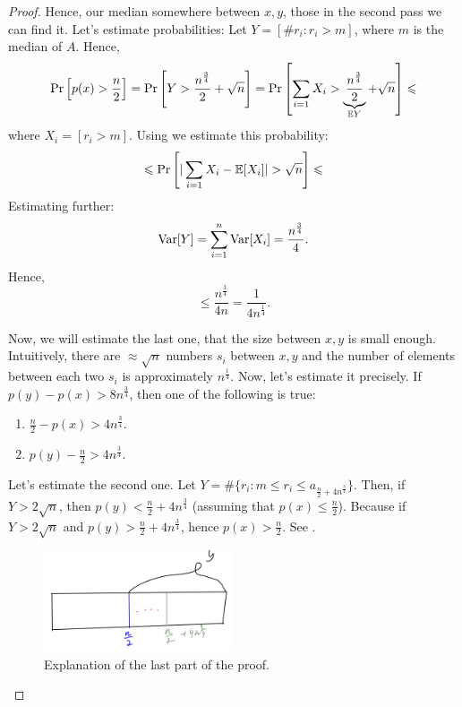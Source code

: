 \begin{proof}
    Hence, our median somewhere between $x, y$, those in the second pass we can find it.
    Let's estimate probabilities:
    Let $Y = [\# r_i \colon r_i > m]$, where $m$ is the median of $A$.
    Hence,
    \begin{align*}
        \Pr\left[p(x) > \frac n 2\right] = \Pr\left[Y > \frac{n^{\frac 3 4}}2 + \sqrt n\right] = \Pr\left[\sum_{i = 1} X_i > \underbrace{\frac{n^{\frac 3 4}}2}_{\mathbb{E} Y} + \sqrt n\right] \leqslant
    \end{align*} where $X_i = [r_i > m]$.
    Using  we estimate this probability:
    \[
        \leqslant \Pr\left[ |\sum_{i = 1} X_i - \mathbb{E}[X_i]| > \sqrt n\right] \leqslant
    \]
    Estimating further:
    \[
        \operatorname{Var}[Y] = \sum_{i = 1}^n \operatorname{Var}[X_i] = \frac {n^{\frac 3 4}} 4.
    \]
    Hence,
    \[
        \leq \frac {n^{\frac 3 4}} {4 n} = \frac {1} {4 n^{\frac 1 4}}.
    \]

    Now, we will estimate the last one, that the size between $x, y$ is small enough.
    Intuitively, there are $\approx \sqrt n$ numbers $s_i$ between $x, y$ and the number of elements between each two $s_i$ is approximately $n^{\frac 1 4}$.
    Now, let's estimate it precisely.
    If $p(y) - p(x) > 8 n^{\frac 3 4}$, then one of the following is true:
    \begin{enumerate}
        \item $\frac n 2 - p(x) > 4 n^{\frac 3 4}$.
        \item $p(y) - \frac n 2 > 4 n^{\frac 3 4}$.
    \end{enumerate}
    Let's estimate the second one.
    Let $Y = \#\{r_i \colon m \leq r_i \leq a_{\frac n 2 + 4 n^{\frac 3 4}}\}$.
    Then, if $Y > 2 \sqrt n$, then $p(y) < \frac n 2 + 4 n^{\frac 3 4}$ (assuming that $p(x) \leq \frac n 2$).
    Because if $Y > 2 \sqrt n$ and $p(y) > \frac n 2 + 4n^{\frac 3 4}$, hence $p(x) > \frac n 2$.
    See .
    \begin{figure}[H]
        \centering
        \includegraphics[width=0.5\textwidth]{figures/1052CAAC-783C-448C-AF25-B072B0C39DFB}
        \caption{Explanation of the last part of the proof.}
        \label{fig:de634714-a125-4fc2-8b73-33475238ecfc}
    \end{figure}


\end{proof}

